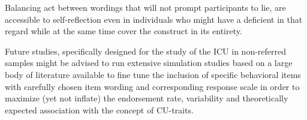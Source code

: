  Balancing act between wordings that will not prompt participants to lie, are accessible to self-reflection even in individuals who might have a deficient in that regard while at the same time cover the construct in its entirety.
 
 Future studies, specifically designed for the study of the ICU in non-referred samples might be advised to run extensive simulation studies based on a large body of literature available to fine tune the inclusion of specific behavioral items
 with carefully chosen item wording and corresponding response scale in order to maximize (yet not inflate) the endorsement rate, variability and theoretically expected association with the concept of CU-traits.
 
